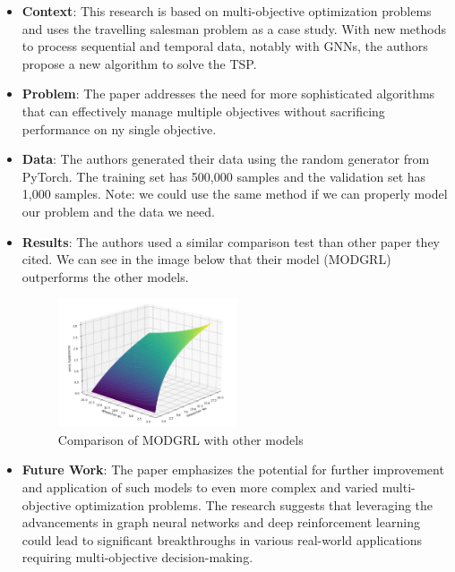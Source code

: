 \documentclass[conference]{IEEEtran}
\begin{document}
    \begin{itemize}
        \item \textbf{Context}:
        This research is based on multi-objective optimization problems and uses the travelling salesman problem as a case study.
        With new methods to process sequential and temporal data, notably with GNNs, the authors propose a new algorithm to solve the TSP\@.
        \item \textbf{Problem}:
        The paper addresses the need for more sophisticated algorithms that can effectively manage multiple objectives without sacrificing performance on ny single objective.
        \item \textbf{Data}:
        The authors generated their data using the random generator from PyTorch.
        The training set has 500,000 samples and the validation set has 1,000 samples.
        Note: we could use the same method if we can properly model our problem and the data we need.
        \item \textbf{Results}:
        The authors used a similar comparison test than other paper they cited.
        We can see in the image below that their model (MODGRL) outperforms the other models.

        \begin{figure}[H]
            \centering
            \includegraphics[width=0.5\textwidth]{resources/score_function}
            \caption{Comparison of MODGRL with other models}
            \label{fig:modgrl_comparison}
        \end{figure}

        \item \textbf{Future Work}:
        The paper emphasizes the potential for further improvement and application of such models to even more complex and varied multi-objective optimization problems.
        The research suggests that leveraging the advancements in graph neural networks and deep reinforcement learning could lead to significant breakthroughs in various real-world applications requiring multi-objective decision-making.
    \end{itemize}
\end{document}
